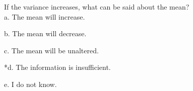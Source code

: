 
If the variance increases, what can be said about the mean?\\

a. The mean will increase.

b. The mean will decrease.

c. The mean will be unaltered.

*d. The information is insufficient.

e. I do not know.\\
